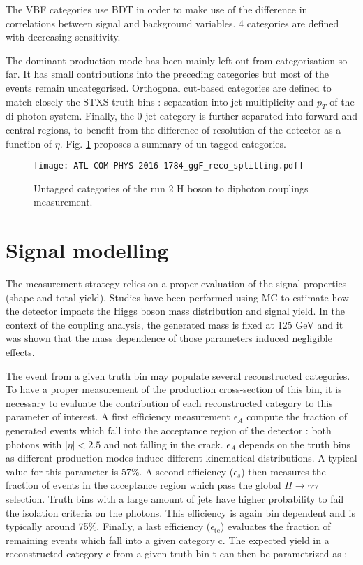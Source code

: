 The VBF categories use BDT in order to make use of the difference in correlations between signal and background variables.
4 categories are defined with decreasing sensitivity.

The dominant production mode has been mainly left out from categorisation so far.
It has small contributions into the preceding categories but most of the events remain uncategorised.
Orthogonal cut-based categories are defined to match closely the STXS truth bins : separation into jet multiplicity and $p_T$ of the di-photon system.
Finally, the 0 jet category is further separated into forward and central regions, to benefit from the difference of resolution of the detector as a function of $\eta$.
Fig. \ref{fig:orgaa34c76} proposes a summary of un-tagged categories.

\begin{figure}[htbp]
\centering
\texttt{[image: ATL-COM-PHYS-2016-1784\_ggF\_reco\_splitting.pdf]}
\caption{\label{fig:orgaa34c76}
Untagged categories of the run 2 H boson to diphoton couplings measurement.\cite{ATL-COM-PHYS-2016-1784}}
\end{figure}

\section{Signal modelling}
\label{sec:org5e08a8b}
\label{sec:HGam_signalModelling}

The measurement strategy relies on a proper evaluation of the signal properties (shape and total yield).
Studies have been performed using MC to estimate how the detector impacts the Higgs boson mass distribution and signal yield.
In the context of the coupling analysis, the generated mass is fixed at 125 GeV and it was shown that the mass dependence of those parameters induced negligible effects.

The event from a given truth bin may populate several reconstructed categories.
To have a proper measurement of the production cross-section of this bin, it is necessary to evaluate the contribution of each reconstructed category to this parameter of interest.
A first efficiency measurement \(\epsilon_A\) compute the fraction of generated events which fall into the acceptance region of the detector : both photons with $|\eta|<2.5$ and not falling in the crack.
\(\epsilon_A\) depends on the truth bins as different production modes induce different kinematical distributions.
A typical value for this parameter is 57\%.
A second efficiency (\(\epsilon_s\)) then measures the fraction of events in the acceptance region which pass the global $H\rightarrow\gamma\gamma$ selection.
Truth bins with a large amount of jets have higher probability to fail the isolation criteria on the photons.
This efficiency is again bin dependent and is typically around 75\%.
Finally, a last efficiency (\(\epsilon_{\text{tc}}\)) evaluates the fraction of remaining events which fall into a given category c.
The expected yield in a reconstructed category c from a given truth bin t can then be parametrized as :

